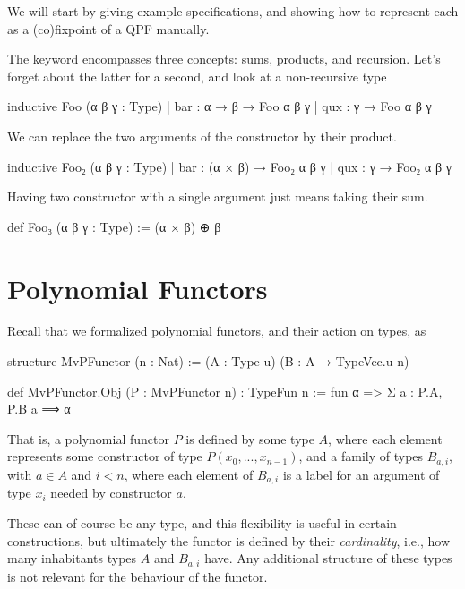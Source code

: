 \documentclass[titlepage]{report}
\begin{document}
\newpage 
\newpage








We will start by giving example specifications, and showing how to represent each as a (co)fixpoint
of a QPF manually.

The  keyword encompasses three concepts: sums, products, and recursion.
Let's forget about the latter for a second, and look at a non-recursive type
\begin{leancode}
    inductive Foo (α β γ : Type)
    | bar : α → β → Foo α β γ
    | qux : γ → Foo α β γ
\end{leancode}
We can replace the two arguments of the  constructor by their product.
\begin{leancode}
    inductive Foo₂ (α β γ : Type)
    | bar : (α × β) → Foo₂ α β γ
    | qux : γ → Foo₂ α β γ
\end{leancode}
Having two constructor with a single argument just means taking their sum.
\begin{leancode}
    def Foo₃ (α β γ : Type) :=
        (α × β) ⊕ β
\end{leancode}




\section{Polynomial Functors}

Recall that we formalized polynomial functors, and their action on types, as  
\begin{leancode}
    structure MvPFunctor (n : Nat) :=
        (A : Type u) (B : A → TypeVec.{u} n)

    def MvPFunctor.Obj (P : MvPFunctor n) : TypeFun n
        := fun α => Σ a : P.A, P.B a ⟹ α
\end{leancode}

That is, a polynomial functor $P$ is defined by some type $A$, where each element represents some 
constructor of type $P(x_0, ..., x_{n-1})$, and a family of types $B_{a, i}$, with $a ∈ A$ and $i < n$, 
where each element of $B_{a,i}$ is a label for an argument of type $x_i$ needed by constructor $a$.

These can of course be any type, and this flexibility is useful in certain constructions,
but ultimately the functor is defined by their \emph{cardinality}, i.e., how many inhabitants types 
$A$ and $B_{a,i}$ have. Any additional structure of these types is not relevant for the behaviour of 
the functor.
\end{document}

